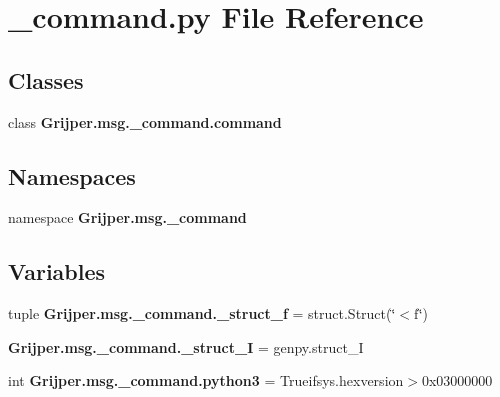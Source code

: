\section{\-\_\-command.\-py File Reference}
\label{__command_8py}
\subsection*{Classes}
\begin{DoxyCompactItemize}
\item 
class {\bf Grijper.\-msg.\-\_\-command.\-command}
\end{DoxyCompactItemize}
\subsection*{Namespaces}
\begin{DoxyCompactItemize}
\item 
namespace {\bf Grijper.\-msg.\-\_\-command}
\end{DoxyCompactItemize}
\subsection*{Variables}
\begin{DoxyCompactItemize}
\item 
tuple {\bf Grijper.\-msg.\-\_\-command.\-\_\-struct\-\_\-f} = struct.\-Struct(\char`\"{}$<$f\char`\"{})
\item 
{\bf Grijper.\-msg.\-\_\-command.\-\_\-struct\-\_\-\-I} = genpy.\-struct\-\_\-\-I
\item 
int {\bf Grijper.\-msg.\-\_\-command.\-python3} = Trueifsys.\-hexversion$>$0x03000000
\end{DoxyCompactItemize}
